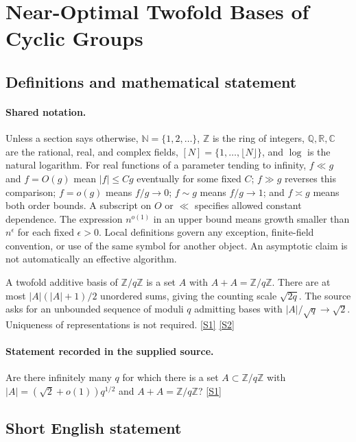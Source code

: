 \documentclass[11pt,a4paper]{article}
\newcommand{\N}{\mathbb{N}}
\newcommand{\Z}{\mathbb{Z}}
\newcommand{\Q}{\mathbb{Q}}
\newcommand{\R}{\mathbb{R}}
\newcommand{\C}{\mathbb{C}}
\newcommand{\sref}[2]{\hyperlink{source:#1:#2}{[S#2]}}
\begin{document}
\section{Near-Optimal Twofold Bases of Cyclic Groups}\label{statement}


\subsection{Definitions and mathematical statement}

\paragraph{Shared notation.}Unless a section says otherwise, $\N=\{1,2,\ldots\}$,
$\Z$ is the ring of integers, $\Q,\R,\C$ are the rational, real, and complex
fields, $[N]=\{1,\ldots,\lfloor N\rfloor\}$, and $\log$ is the natural
logarithm. For real functions of a parameter tending to infinity,
$f\ll g$ and $f=O(g)$ mean $|f|\leq Cg$ eventually for some fixed $C$;
$f\gg g$ reverses this comparison; $f=o(g)$ means $f/g\to0$;
$f\sim g$ means $f/g\to1$; and $f\asymp g$ means both order bounds.
A subscript on $O$ or $\ll$ specifies allowed constant dependence.
The expression $n^{o(1)}$ in an upper bound means growth smaller than
$n^\epsilon$ for each fixed $\epsilon>0$. Local definitions govern any
exception, finite-field convention, or use of the same symbol for another
object. An asymptotic claim is not automatically an effective algorithm.



A twofold additive basis of $\Z/q\Z$ is a set $A$ with $A+A=\Z/q\Z$. There are at most $|A|(|A|+1)/2$ unordered sums, giving the counting scale $\sqrt{2q}$. The source asks for an unbounded sequence of moduli $q$ admitting bases with $|A|/\sqrt q\to\sqrt2$. Uniqueness of representations is not required. \sref{statement}{1} \sref{statement}{2}

\paragraph{Statement recorded in the supplied source.}
Are there infinitely many $q$ for which there is a set $A \subset \mathbb{Z}/q\mathbb{Z}$ with $|A| = (\sqrt{2} + o(1))q^{1/2}$ and $A + A = \mathbb{Z}/q\mathbb{Z}$? \sref{statement}{1}

\subsection{Short English statement}
\end{document}
